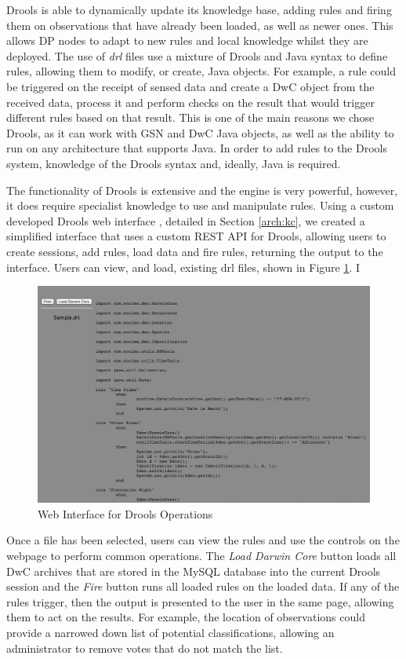 	Drools is able to dynamically update its knowledge base, adding rules and firing them on observations that have already been loaded, as well as newer ones. This allows DP nodes to adapt to new rules and local knowledge whilst they are deployed. The use of \textit{drl} files use a mixture of Drools and Java syntax to define rules, allowing them to modify, or create, Java objects. For example, a rule could be triggered on the receipt of sensed data and create a DwC object from the received data, process it and perform checks on the result that would trigger different rules based on that result. This is one of the main reasons we chose Drools, as it can work with GSN and DwC Java objects, as well as the ability to run on any architecture that supports Java. In order to add rules to the Drools system, knowledge of the Drools syntax and, ideally, Java is required.
	
	The functionality of Drools is extensive and the engine is very powerful, however, it does require specialist knowledge to use and manipulate rules. Using a custom developed Drools web interface , detailed in Section \ref{arch:kc}, we created a simplified interface that uses a custom REST API for Drools, allowing users to create sessions, add rules, load data and fire rules, returning the output to the interface. Users can view, and load, existing drl files, shown in Figure \ref{kc:loris_drl}. I
	
		\begin{figure}[h]
		\centering
		\includegraphics[width=\textwidth]{Chap4/figures/rules}
		\caption{Web Interface for Drools Operations}
		\label{kc:loris_drl}
		\end{figure}
	
	Once a file has been selected, users can view the rules and use the controls on the webpage to perform common operations. The \textit{Load Darwin Core} button loads all DwC archives that are stored in the MySQL database into the current Drools session and the \textit{Fire} button runs all loaded rules on the loaded data. If any of the rules trigger, then the output is presented to the user in the same page, allowing them to act on the results. For example, the location of observations could provide a narrowed down list of potential classifications, allowing an administrator to remove votes that do not match the list.

